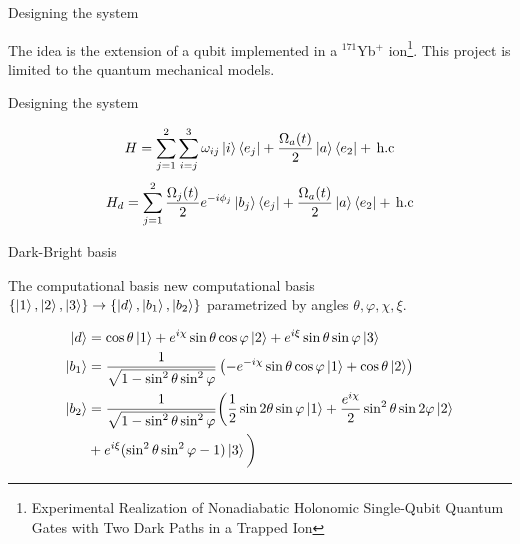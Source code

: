 \documentclass[t]{beamer}
\begin{document}
\begin{frame}{Designing the system}

The idea is the extension of a qubit implemented in a $^{171}$Yb$^{+}$ ion\footnote{Experimental Realization of Nonadiabatic Holonomic
Single-Qubit Quantum Gates with Two Dark Paths in a
Trapped Ion}.
This project is limited to the quantum mechanical models.
\end{frame}


\begin{frame}{Designing the system}



\begin{equation}
H = \sum_{j = 1}^2 \sum_{i =j}^{3} \omega_{ij}\ket{i}\bra{e_j}  + \frac{\Omega_{a}(t)}{2}\ket{a}\bra{e_2}  +\,\text{h.c} 
\end{equation}
\begin{equation}
 H_d = \sum_{j = 1}^2 \frac{\Omega_j(t)}{2}e^{-i\phi_j}\ket{b_j}\bra{e_j}  + \frac{\Omega_a(t)}{2}\ket{a}\bra{e_2}  +\,\text{h.c}
\end{equation}

\end{frame}

\begin{frame}{Dark-Bright basis}

The computational basis new computational basis $\{\ket{1},\ket{2},\ket{3}\} \rightarrow \{\ket{d},\ket{b_1},\ket{b_2}\}$ 
parametrized by angles $\theta,\varphi,\chi,\xi$.


\begin{equation}
\begin{aligned}
\ket{d} &= \cos\theta\ket{1} + e^{i\chi}\sin\theta\cos\varphi\ket{2} + e^{i\xi}\sin\theta\sin\varphi\ket{3}
\\
\ket{b_1} &= \frac{1}{\sqrt{1-\sin^2\theta\sin^2\varphi}} \left(-e^{-i\chi}\sin\theta\cos\varphi\ket{1} + \cos\theta\ket{2} \right)
\\
\ket{b_2} &= \frac{1}{\sqrt{1-\sin^2\theta\sin^2\varphi}} \bigg(\frac{1}{2}\sin 2\theta\sin\varphi\ket{1} + \dfrac{e^{i\chi}}{2}\sin^2\theta\sin 2\varphi\ket{2} \\&+ e^{i\xi}(\sin^2\theta\sin^2\varphi - 1)\ket{3}\bigg)
\end{aligned}
\end{equation}

\end{frame}
\end{document}
